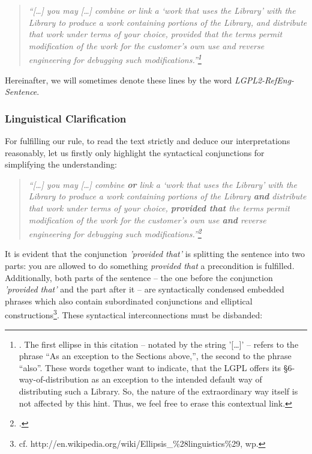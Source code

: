 \begin{quote}\noindent\emph{\enquote{[\ldots] you may [\ldots] combine or link a
\enquote{work that uses the Library} with the Library to produce a work
containing portions of the Library, and distribute that work under terms of your
choice, provided that the terms permit modification of the work for the
customer's own use and \emph{reverse engineering} for debugging such
modifications.}\footnote{\cite[cf.][\nopage wp., §6. ]{Lgpl21OsiLicense1999a}.
The first ellipse in this citation -- notated by the string '[\ldots]' -- refers
to the phrase \enquote{As an exception to the Sections above,}, the second to
the phrase \enquote{also}. These words together want to indicate, that the LGPL
offers its §6-way-of-distribution as an exception to the intended default way of
distributing such a Library. So, the nature of the extraordinary way itself is
not affected by this hint. Thus, we feel free to erase this contextual
link.}}\end{quote}

Hereinafter, we will sometimes denote these lines by
the word \emph{LGPL2-RefEng-Sentence}.

\subsubsection{Linguistical Clarification}

For fulfilling our rule, to read the text strictly and deduce our
interpretations reasonably, let us firstly only highlight the syntactical
conjunctions for simplifying the understanding:

\begin{quote}\noindent\emph{\enquote{[\ldots] you may [\ldots] combine
\textbf{or} link a \enquote{work that uses the Library} with the Library to
produce a work containing portions of the Library \textbf{and} distribute that
work under terms of your choice, \textbf{provided that} the terms permit
modification of the work for the customer's own use \textbf{and} \emph{reverse
engineering} for debugging such modifications.}\footnote{\cite[cf.][\nopage wp.,
§6, emphasis KR.]{Lgpl21OsiLicense1999a}.}}
\end{quote}

It is evident that the conjunction \emph{'provided that'} is splitting the
sentence into two parts: you are allowed to do something \emph{provided that} a
precondition is fulfilled. Additionally, both parts of the sentence --
the one before the conjunction \emph{'provided that'} and the part after it --
are syntactically condensed embedded phrases which also contain subordinated 
conjunctions and elliptical constructions\footnote{cf.
http://en.wikipedia.org/wiki/Ellipsis\_\%28linguistics\%29, wp.
}. These syntactical interconnections must be disbanded:


